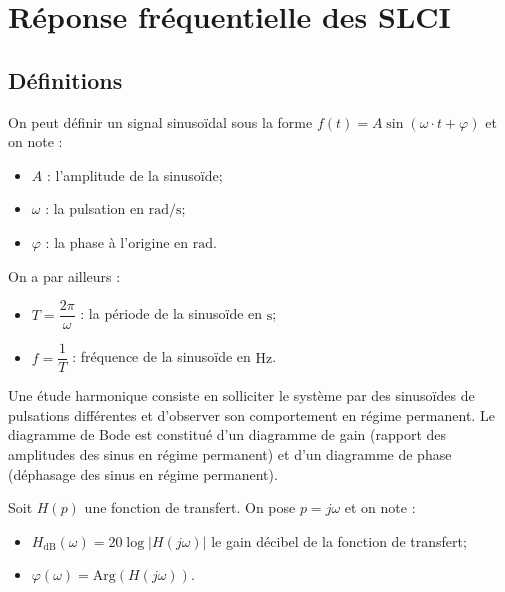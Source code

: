 \section{Réponse fréquentielle des SLCI}
\subsection{Définitions}


On peut définir un signal sinusoïdal sous la forme $
f(t)=A \sin(\omega \cdot t + \varphi)
$ et on note :

\begin{itemize}
\item $A$ : l'amplitude de la sinusoïde;
\item $\omega$ : la pulsation en $\text{rad/s}$;
\item $\varphi$ : la phase à l'origine en $\text{rad}$.
\end{itemize}

On a par ailleurs :
\begin{itemize}
\item $T=\dfrac{2\pi}{\omega}$ : la période de la sinusoïde en $\text{s}$;
\item $f=\dfrac{1}{T}$ : fréquence de la sinusoïde en $\text{Hz}$.
\end{itemize}

Une étude harmonique consiste en solliciter le système par des sinusoïdes de pulsations différentes et d'observer son comportement en régime permanent. Le diagramme de Bode est constitué d'un diagramme de gain (rapport des amplitudes des sinus en régime permanent) et d'un diagramme de phase (déphasage des sinus en régime permanent). 

\begin{defi}
Soit $H(p)$ une fonction de transfert. On pose $p=j\omega$ et on note :  \begin{itemize}
\item $H_{\text{dB}}\left( \omega\right) =20\log |H(j\omega)|$ le gain décibel de la fonction de transfert;
\item $\varphi\left( \omega\right) = \text{Arg}\left(H(j\omega) \right)$.
\end{itemize}
\end{defi}

